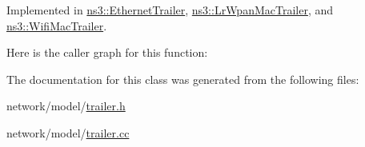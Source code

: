 Implemented in \hyperlink{classns3_1_1EthernetTrailer_a0409af8e45e598fe3fd10406b43d1594}{ns3\+::\+Ethernet\+Trailer}, \hyperlink{classns3_1_1LrWpanMacTrailer_a8a945270af865e4983035780d181c609}{ns3\+::\+Lr\+Wpan\+Mac\+Trailer}, and \hyperlink{classns3_1_1WifiMacTrailer_a34048bbf33152f01575c94c3031f7c51}{ns3\+::\+Wifi\+Mac\+Trailer}.



Here is the caller graph for this function\+:




The documentation for this class was generated from the following files\+:\begin{DoxyCompactItemize}
\item 
network/model/\hyperlink{trailer_8h}{trailer.\+h}\item 
network/model/\hyperlink{trailer_8cc}{trailer.\+cc}\end{DoxyCompactItemize}
